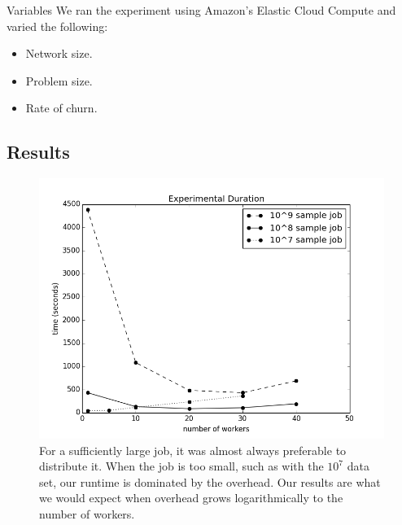 \documentclass[11pt]{beamer}
\begin{document}
\begin{frame}{Variables}
We ran the experiment using Amazon's Elastic Cloud Compute \cite{amazon-instances} and varied the following:
	\begin{itemize}
		\item Network size.
		\item Problem size.
		\item Rate of churn.
	\end{itemize}
\end{frame}


\subsection{Results}


\begin{frame}
\begin{figure}
    \includegraphics[width=0.65\linewidth]{expTime}
    \caption{For a sufficiently large job, it was almost always preferable to distribute it.  When the job is too small, such as with the $10^{7}$ data set, our runtime is dominated by the overhead.  Our results are what we would expect when overhead grows logarithmically to the number of workers.}
    \label{expTime}
\end{figure}

\end{frame}
\end{document}
